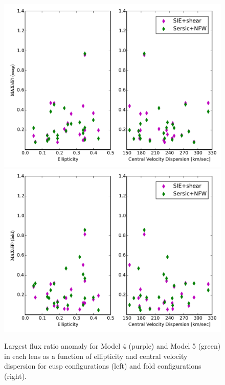 \begin{figure}
	{\includegraphics[trim=0cm 0.3cm 0cm 0.3cm,clip,width=.48\textwidth]{./figures_sls/EllipVdis_vs_fluxratio_maxanomaly_cusp-eps-converted-to.pdf}}
	{\includegraphics[trim=0cm 0.3cm 0cm 0.3cm,clip,width=.48\textwidth]{./figures_sls/EllipVdis_vs_fluxratio_maxanomaly_fold-eps-converted-to.pdf}}
	\caption[Largest flux ratio anomalies as a function of ellipticity and central velocity dispersion for the smooth model fits]{\label{fig:fluxratios_45}Largest flux ratio anomaly for Model 4 (purple) and Model 5 (green) in each lens as a function of ellipticity and central velocity dispersion for cusp configurations (left) and fold configurations (right).}
\end{figure}
